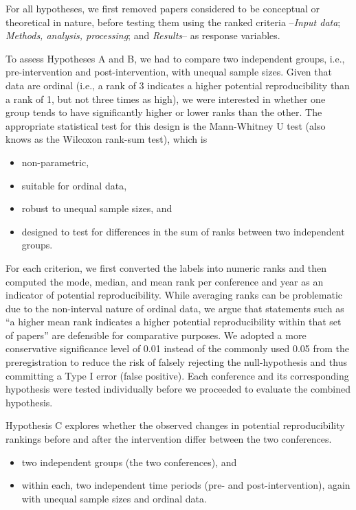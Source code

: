 \documentclass{josis}
\begin{document}
For all hypotheses, we first removed papers considered to be conceptual or theoretical in nature, before testing them using the ranked criteria --\textit{Input data}; \textit{Methods, analysis, processing}; and \textit{Results}-- as response variables.

To assess Hypotheses A and B, we had to compare two independent groups, i.e., pre-intervention and post-intervention, with unequal sample sizes.
Given that data are ordinal (i.e., a rank of 3 indicates a higher potential reproducibility than a rank of 1, but not three times as high), we were interested in whether one group tends to have significantly higher or lower ranks than the other. 
The appropriate statistical test for this design is the Mann-Whitney U test (also knows as the Wilcoxon rank-sum test), which is

\begin{itemize}
    \item non-parametric,
    \item suitable for ordinal data,
    \item robust to unequal sample sizes, and
    \item designed to test for differences in the sum of ranks between two independent groups.
\end{itemize}

For each criterion, we first converted the labels into numeric ranks and then computed the mode, median, and mean rank per conference and year as an indicator of potential reproducibility. 
While averaging ranks can be problematic due to the non-interval nature of ordinal data, we argue that statements such as ``a higher mean rank indicates a higher potential reproducibility within that set of papers'' are defensible for comparative purposes. 
We adopted a more conservative significance level of 0.01 instead of the commonly used 0.05 from the preregistration to reduce the risk of falsely rejecting the null-hypothesis and thus committing a Type I error (false positive). 
Each conference and its corresponding hypothesis were tested individually before we proceeded to evaluate the combined hypothesis.

Hypothesis C explores whether the observed changes in potential reproducibility rankings before and after the intervention differ between the two conferences. 

\begin{itemize}
    \item two independent groups (the two conferences), and
    \item within each, two independent time periods (pre- and post-intervention), again with unequal sample sizes and ordinal data.
\end{itemize}
\end{document}
